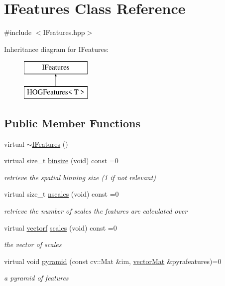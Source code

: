 \hypertarget{classIFeatures}{\section{I\-Features Class Reference}
\label{classIFeatures}
}


{\ttfamily \#include $<$I\-Features.\-hpp$>$}

Inheritance diagram for I\-Features\-:\begin{figure}[H]
\begin{center}
\leavevmode
\includegraphics[height=2.000000cm]{classIFeatures}
\end{center}
\end{figure}
\subsection*{Public Member Functions}
\begin{DoxyCompactItemize}
\item 
virtual \hyperlink{classIFeatures_a7de8c9d6739ebd4504f9d033d71c2f42}{$\sim$\-I\-Features} ()
\item 
virtual size\-\_\-t \hyperlink{classIFeatures_a79f6861190d7c2754d560c6c10baa787}{binsize} (void) const =0
\begin{DoxyCompactList}\small\item\em retrieve the spatial binning size (1 if not relevant) \end{DoxyCompactList}\item 
virtual size\-\_\-t \hyperlink{classIFeatures_abf8d0bf5f66e7b3188ca73b5c9e48a1f}{nscales} (void) const =0
\begin{DoxyCompactList}\small\item\em retrieve the number of scales the features are calculated over \end{DoxyCompactList}\item 
virtual \hyperlink{types_8hpp_a4da5db3ee9e284f719ef5764dbadffc8}{vectorf} \hyperlink{classIFeatures_ad02aea9fd29e438d25e1c7d68c508b9e}{scales} (void) const =0
\begin{DoxyCompactList}\small\item\em the vector of scales \end{DoxyCompactList}\item 
virtual void \hyperlink{classIFeatures_a0cd270503671145fae965c8d9fedc91a}{pyramid} (const cv\-::\-Mat \&im, \hyperlink{types_8hpp_a3207a7addcfa415d1c83622febcb1e9b}{vector\-Mat} \&pyrafeatures)=0
\begin{DoxyCompactList}\small\item\em a pyramid of features \end{DoxyCompactList}\end{DoxyCompactItemize}


